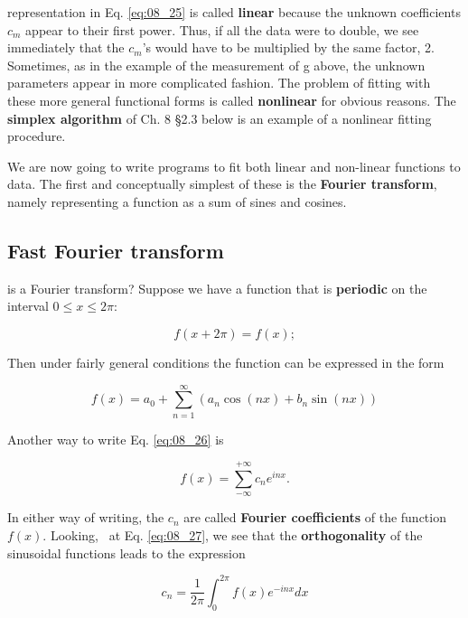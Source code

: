  representation in Eq. \ref{eq:08_25} is called \textbf{linear} because the unknown coefficients $c_{m}$ appear to their first power. Thus, if all the data were to double, we see immediately that the $c_{m}$'s would have to be multiplied by the same factor, 2. Sometimes, as in the example of the measurement of g above, the unknown parameters appear in more complicated fashion. The problem of fitting with these more general functional forms is called \textbf{nonlinear} for obvious reasons. The \textbf{simplex algorithm} of Ch. 8 \S2.3 below is an example of a nonlinear fitting procedure.

We are now going to write programs to fit both linear and non-linear functions to data. The first and conceptually simplest of these is the \textbf{Fourier transform}, namely representing a function as a sum of sines and cosines.

\subsection{Fast Fourier transform}
 is a Fourier transform? Suppose we have a function that is \textbf{periodic} on the interval $0 \leq x \leq 2\pi$:

\begin{equation*}
f(x + 2\pi) = f(x) ;
\end{equation*}

Then under fairly general conditions the function can be expressed in the form

\begin{equation}\label{eq:08_26}
f(x) = a_{0} + \sum_{n=1}^{\infty} (a_{n} \cos(nx) + b_{n} \sin(nx))
\end{equation}

Another way to write Eq. \ref{eq:08_26} is

\begin{equation}\label{eq:08_27}
f(x) = \sum_{-\infty}^{+\infty} c_{n}e^{inx}.
\end{equation}

In either way of writing, the $c_{n}$ are called \textbf{Fourier coefficients} of the function $f(x)$. Looking, \eg\ at Eq. \ref{eq:08_27}, we see that the \textbf{orthogonality} of the sinusoidal functions leads to the expression

\begin{equation}\label{eq:08_28}
c_{n} = \frac{1}{2\pi}\int_{0}^{2\pi}f(x)e^{-inx}dx
\end{equation}

